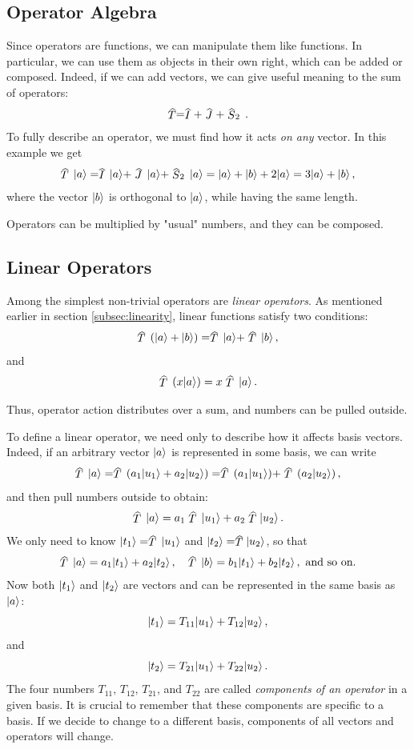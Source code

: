 \subsection{Operator Algebra}
Since operators are functions, we can manipulate them like functions. In particular, we can use them as objects in their own right, which can be added or composed. Indeed, if we can add vectors, we can give useful meaning to the sum of operators:
\[
\op{T} = \op{I} + \op{J} + \op{S}_2\,.
\]
To fully describe an operator, we must find how it acts \emph{on any} vector. In this example we get
\[
\op{T}\,\ket{a} = \op{I}\,\ket{a} + \op{J}\,\ket{a} + \op{S}_2\,\ket{a}=\ket{a}+\ket{b}+2\ket{a}=3\ket{a}+\ket{b}\,,
\]
where the vector $|{b}\rangle$ is orthogonal to $|{a}\rangle$, while having the same length.

Operators can be multiplied by "usual" numbers, and they can be composed.


\subsection{Linear Operators}
Among the simplest non-trivial operators are \emph{linear operators}. As mentioned earlier in section \ref{subsec:linearity}, linear functions satisfy two conditions:
\[
\op{T}\,(\ket{a}+\ket{b}) = \op{T}\,\ket{a}+\op{T}\,\ket{b}\,,
\]
and
\[
\op{T}\,(x\ket{a}) = x\op{T}\,\ket{a}\,.
\]
\begin{remark}
	Thus, operator action distributes over a sum, and numbers can be pulled outside.
\end{remark}


To define a linear operator, we need only to describe how it affects basis vectors. Indeed, if an arbitrary vector $|{a}\rangle$ is represented in some basis, we can write
\[
\op{T}\,\ket{a} = \op{T}\,(a_1\ket{u_1}+a_2\ket{u_2}) = \op{T}\,(a_1\ket{u_1})+\op{T}\,(a_2\ket{u_2})\,,
\]
and then pull numbers outside to obtain:
\[
\op{T}\,\ket{a} = a_1\op{T}\,\ket{u_1}+a_2\op{T}\ket{u_2}\,.
\]
We only need to know $\ket{t_1}=\op{T}\,\ket{u_1}$ and $\ket{t_2}=\op{T}\ket{u_2}$, so that 
\[
\op{T}\,\ket{a}=a_1\ket{t_1}+a_2\ket{t_2}\,,\quad \op{T}\,\ket{b}=b_1\ket{t_1}+b_2\ket{t_2}\,,\textrm{ and so on}.
\]
Now both $|{t_1}\rangle$ and $|{t_2}\rangle$ are vectors and can be represented in the same basis as $|{a}\rangle$:
\[
|{t_1}\rangle=T_{11}|{u_1}\rangle+T_{12}|{u_2}\rangle\,,
\]
and
\[
|{t_2}\rangle=T_{21}|{u_1}\rangle+T_{22}|{u_2}\rangle\,.
\]
The four numbers $T_{11},\,T_{12},\,T_{21}$, and $T_{22}$ are called \emph{components of an operator} in a given basis. It is crucial to remember that these components are specific to a basis. If we decide to change to a different basis, components of all vectors and operators will change.

